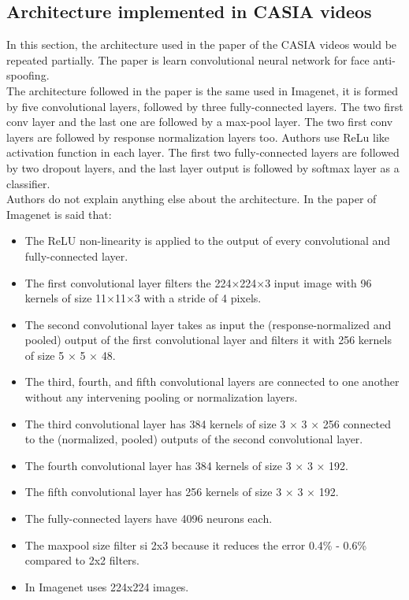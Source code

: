 
\clearpage

\subsection{Architecture implemented in CASIA videos}
In this section, the architecture used in the paper of the CASIA videos would be repeated partially. The paper is learn convolutional neural network for face anti-spoofing.\\

The architecture followed in the paper is the same used in Imagenet, it is formed by five convolutional layers, followed by three fully-connected layers. The two first conv layer and the last one are followed by a max-pool layer. The two first conv layers are followed by response normalization layers too. Authors use ReLu like activation function in each layer. The first two fully-connected layers are followed by two dropout layers, and the last layer output is followed by softmax layer as a classifier.\\

Authors do not explain anything else about the architecture. In the paper of Imagenet is said that:

\begin{itemize}
\item The ReLU non-linearity is applied to the output of every convolutional and fully-connected layer.
\item The first convolutional layer filters the 224×224×3 input image with 96 kernels of size 11×11×3 with a stride of 4 pixels.
\item The second convolutional layer takes as input the (response-normalized and pooled) output of the first convolutional layer and filters it with 256 kernels of size 5 × 5 × 48.
\item The third, fourth, and fifth convolutional layers are connected to one another without any intervening pooling or normalization layers.
\item The third convolutional layer has 384 kernels of size 3 × 3 × 256 connected to the (normalized, pooled) outputs of the second convolutional layer.
\item The fourth convolutional layer has 384 kernels of size 3 × 3 × 192.
\item  The fifth convolutional layer has 256 kernels of size 3 × 3 × 192.
\item The fully-connected layers have 4096 neurons each.
\item The maxpool size filter si 2x3 because it reduces the error 0.4\% - 0.6\% compared to 2x2 filters.
\item In Imagenet uses 224x224 images.
\end{itemize}

